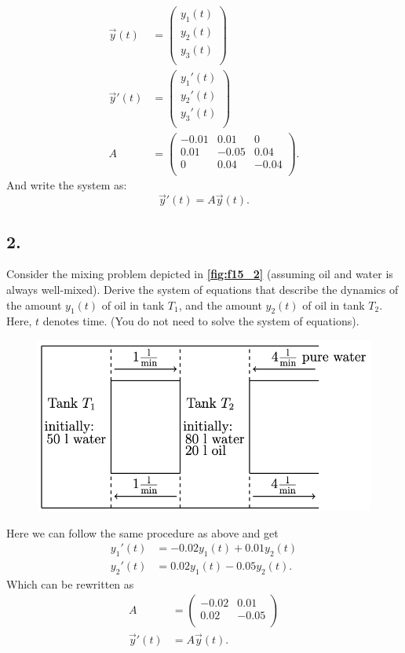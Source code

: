 \begin{align*}
  \Vec{y}(t) &= \begin{pmatrix}
  y_1(t)\\
  y_2(t)\\
  y_3(t)\\
  \end{pmatrix} \\
  \Vec{y}'(t) &= \begin{pmatrix}
  y_1'(t)\\
  y_2'(t)\\
  y_3'(t)\\
  \end{pmatrix} \\
    A &= \begin{pmatrix}
    - \num{0,01}  & \num{0,01}  & 0\\
    \num{0,01}  & -\num{0,05}  & \num{0,04} \\
    0 & \num{0,04}  & -\num{0,04} \\
    \end{pmatrix}
.\end{align*}
And write the system as:
\[ 
\Vec{y}'(t) = A \Vec{y}(t)
.\]


\subsection*{2.} Consider the mixing problem depicted in \textbf{\autoref{fig:f15_2}} (assuming oil and water is always well-mixed). Derive the system of equations that describe the dynamics of the amount $y_1(t)$ of oil in tank $T_1$, and the amount $y_2(t)$ of oil in tank $T_2$. Here, $t$ denotes time. (You do not need to solve the system of equations).
\begin{figure} [ht]
  \centering
  \caption{}
  \includegraphics[width=0.5\linewidth]{../figures/f15_2.png}
  \label{fig:f15_2}
\end{figure}
\bigbreak
Here we can follow the same procedure as above and get
\begin{align*}
  y_1'(t) &= -\num{0,02} y_1(t) + \num{0,01} y_2(t) \\
  y_2'(t) &= \num{0,02} y_1(t) - \num{0,05} y_2(t)
.\end{align*}
Which can be rewritten as
\begin{align*}
  A &= \begin{pmatrix}
  -\num{0,02}  & \num{0,01} \\
  \num{0,02}  & -\num{0,05} \\
  \end{pmatrix} \\
    \Vec{y}'(t) &= A\Vec{y}(t)
.\end{align*}


